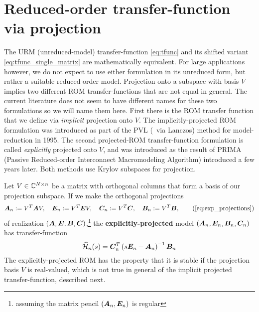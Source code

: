 \section{Reduced-order transfer-function via projection }\label{sec:projected_ROMs}
The URM (unreduced-model) transfer-function \eqref{eq:tfunc} and  its shifted variant \eqref{eq:tfunc_single_matrix} are mathematically equivalent. For large applications however, we do not expect to use either formulation in its unreduced form, but rather a suitable reduced-order model.   Projection onto a subspace with basis $V$ implies two different ROM transfer-functions that are not equal in general.    The current literature does not seem to have different names for these two formulations so we will name them here.   First there is the ROM transfer function that we define via \emph{implicit} projection onto $V$.   The implicitly-projected ROM formulation was introduced as part of the PVL (\pade\ via Lanczos) method \cite{PVL} for model-reduction in 1995.     The second projected-ROM transfer-function formulation is called \emph{explicitly} projected onto $V$, and was introduced as the result of PRIMA (Passive Reduced-order Interconnect Macromodeling Algorithm) \cite{PRIMA} introduced a few years later.    Both methods use Krylov subspaces for projection.    

\medskip
Let $V\in\mathbb{C}^{N \times n}$ be a matrix with orthogonal columns that form a basis of our projection subspace.  
If we make the orthogonal projections 
\begin{equation*}
          \A_n := V^T \A V, \quad \E_n := V^T \E V, \quad \CC_n := V^T\CC, \quad \BB_n := V^T\BB,
          \tag{\ref{eq:exp_projections}}
 \end{equation*}	
of realization $(\bm{A},\bm{E},\bm{B},\bm{C})$,\footnote{assuming the matrix pencil $(\bm{A}_n,\bm{E}_n)$ is regular} the {\bf explicitly-projected}  model $(\bm{A}_n,\bm{E}_n,\bm{B}_n,\bm{C}_n)$ has transfer-function    
         \begin{equation}
                        \widehat{\mathcal{H}}_n(s) = \bm{C}_n^T\left(s\bm{E}_n-\bm{A}_n\right)^{-1}\bm{B}_n
         \label{eq:rm_explicit}
         \end{equation}
The explicitly-projected ROM  has the property  that it is stable if the projection basis $V$ is real-valued, which is not true in general of the implicit projected transfer-function, described next. 

